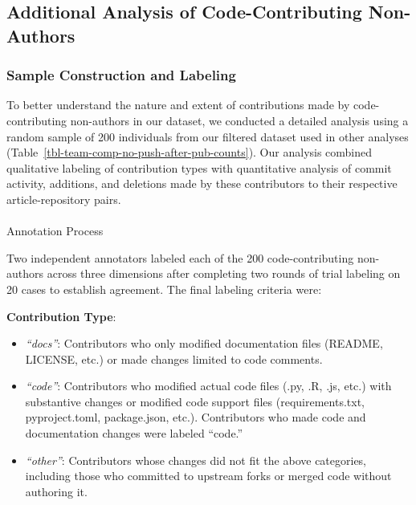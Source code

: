 \documentclass[
  letterpaper,
  DIV=11,
  numbers=noendperiod]{scrartcl}
\makeatletter
\let\oldparagraph\paragraph
\renewcommand{\paragraph}{
    \@ifstar
      \xxxParagraphStar
      \xxxParagraphNoStar
  }
\newcommand{\xxxParagraphStar}[1]{\oldparagraph*{#1}\mbox{}}
\newcommand{\xxxParagraphNoStar}[1]{\oldparagraph{#1}\mbox{}}
\providecommand{\tightlist}{%
  \setlength{\itemsep}{0pt}\setlength{\parskip}{0pt}}
\makeatother
\begin{document}
\subsection{Additional Analysis of Code-Contributing
Non-Authors}\label{sec-appendix-additional-cc-na-analysis}

\subsubsection{Sample Construction and
Labeling}\label{sample-construction-and-labeling}

To better understand the nature and extent of contributions made by
code-contributing non-authors in our dataset, we conducted a detailed
analysis using a random sample of 200 individuals from our filtered
dataset used in other analyses
(Table~\ref{tbl-team-comp-no-push-after-pub-counts}). Our analysis
combined qualitative labeling of contribution types with quantitative
analysis of commit activity, additions, and deletions made by these
contributors to their respective article-repository pairs.

\paragraph{Annotation Process}\label{annotation-process}

Two independent annotators labeled each of the 200 code-contributing
non-authors across three dimensions after completing two rounds of trial
labeling on 20 cases to establish agreement. The final labeling criteria
were:

\textbf{Contribution Type}:

\begin{itemize}
\tightlist
\item
  \emph{``docs''}: Contributors who only modified documentation files
  (README, LICENSE, etc.) or made changes limited to code comments.
\item
  \emph{``code''}: Contributors who modified actual code files (.py, .R,
  .js, etc.) with substantive changes or modified code support files
  (requirements.txt, pyproject.toml, package.json, etc.). Contributors
  who made code and documentation changes were labeled ``code.''
\item
  \emph{``other''}: Contributors whose changes did not fit the above
  categories, including those who committed to upstream forks or merged
  code without authoring it.
\end{itemize}
\end{document}

